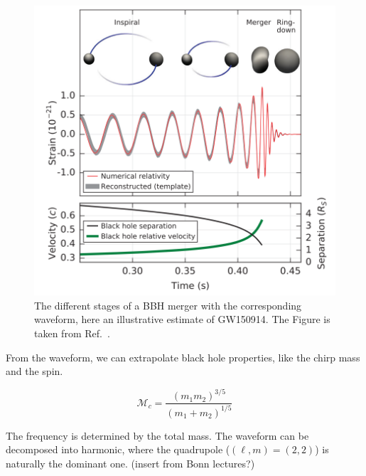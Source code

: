 \begin{figure}[h]
    \centering
    \includegraphics[width=0.7\linewidth]{Images/waveform_abbott_complete.png}
    \caption{The different stages of a BBH merger with the corresponding waveform, here an illustrative estimate of GW150914. The Figure is taken from Ref.\ \cite{abbott_observation_2016}.}
    \label{GW_waveform}
\end{figure} 

From the waveform, we can extrapolate black hole properties, like the chirp mass and the spin. 

\begin{equation}
    \mathcal{M}_c = \frac{(m_1m_2)^{3/5}}{(m_1+m_2)^{1/5}}
\end{equation}

The frequency is determined by the total mass. 
The waveform can be decomposed into harmonic, where the quadrupole ($(\ell, m)=(2,2)$) is naturally the dominant one. 
(insert from Bonn lectures?)

